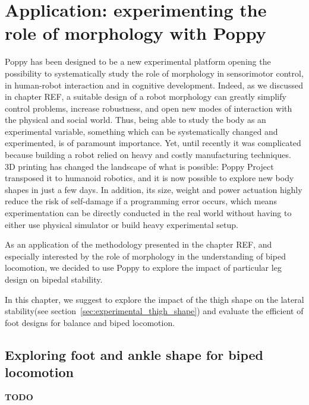
\chapter{Application: experimenting the role of morphology with Poppy} %
\label{cha:exploring_the_role_of_morphology}


Poppy has been designed to be a new experimental platform opening the possibility to systematically study the role of morphology in sensorimotor control, in human-robot interaction and in cognitive development. Indeed, as we discussed in chapter REF, a suitable design of a robot morphology can greatly simplify control problems, increase robustness, and open new modes of interaction with the physical and social world. Thus, being able to study the body as an experimental variable, something which can be systematically changed and experimented, is of paramount importance. Yet, until recently it was complicated because building a robot relied on heavy and costly manufacturing techniques. 3D printing has changed the landscape of what is possible: Poppy Project transposed it to humanoid robotics, and it is now possible to explore new body shapes in just a few days. In addition, its size, weight and power actuation highly reduce the risk of self-damage if a programming error occurs, which means experimentation can be directly conducted in the real world without having to either use physical simulator or build heavy experimental setup.

As an application of the methodology presented in the chapter REF, and especially interested by the role of morphology in the understanding of biped locomotion, we decided to use Poppy to explore the impact of particular leg design on bipedal stability.

In this chapter, we suggest to explore the impact of the thigh shape on the lateral stability(see section~\ref{sec:experimental_thigh_shape}) and evaluate the efficient of foot designs for balance and biped locomotion.



\section{Exploring foot and ankle shape for biped locomotion} %
\textbf{TODO}

